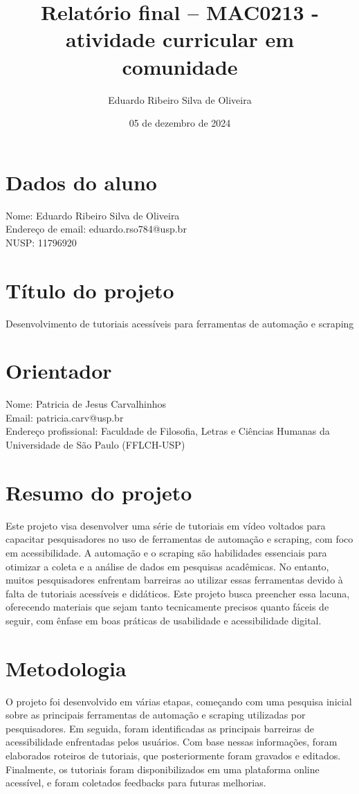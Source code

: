 \documentclass{article}
\title{Relatório final – MAC0213 - atividade curricular em comunidade}
\author{Eduardo Ribeiro Silva de Oliveira}
\date{05 de dezembro de 2024}
\begin{document}
\maketitle

\section*{Dados do aluno}
Nome: Eduardo Ribeiro Silva de Oliveira\\
Endereço de email: eduardo.rso784@usp.br\\
NUSP: 11796920

\section*{Título do projeto}
Desenvolvimento de tutoriais acessíveis para ferramentas de automação e scraping

\section*{Orientador}
Nome: Patricia de Jesus Carvalhinhos\\
Email: patricia.carv@usp.br\\
Endereço profissional: Faculdade de Filosofia, Letras e Ciências Humanas da Universidade de São Paulo (FFLCH-USP)

\section*{Resumo do projeto}
Este projeto visa desenvolver uma série de tutoriais em vídeo voltados para capacitar pesquisadores no uso de ferramentas de automação e scraping, com foco em acessibilidade. A automação e o scraping são habilidades essenciais para otimizar a coleta e a análise de dados em pesquisas acadêmicas. No entanto, muitos pesquisadores enfrentam barreiras ao utilizar essas ferramentas devido à falta de tutoriais acessíveis e didáticos. Este projeto busca preencher essa lacuna, oferecendo materiais que sejam tanto tecnicamente precisos quanto fáceis de seguir, com ênfase em boas práticas de usabilidade e acessibilidade digital.

\section*{Metodologia}
O projeto foi desenvolvido em várias etapas, começando com uma pesquisa inicial sobre as principais ferramentas de automação e scraping utilizadas por pesquisadores. Em seguida, foram identificadas as principais barreiras de acessibilidade enfrentadas pelos usuários. Com base nessas informações, foram elaborados roteiros de tutoriais, que posteriormente foram gravados e editados. Finalmente, os tutoriais foram disponibilizados em uma plataforma online acessível, e foram coletados feedbacks para futuras melhorias.
\end{document}
